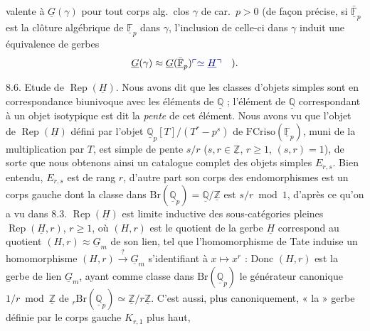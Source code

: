 \documentclass[11pt,a4paper]{article}
\begin{document}
valente à $\underline{G}(\gamma)$ pour tout corps alg.\ clos $\gamma$ de
car.\ $p > 0$ (de façon précise, si $\bar{\underline{\mathbb{F}}}_{p}$ est la
clôture algébrique de $\underline{\mathbb{F}}_{p}$ dans $\gamma$, l'inclusion
de celle-ci dans $\gamma$ induit une équivalence de gerbes
\[
\underline{G}(\gamma) \approx \underline{G}(\bar{\underline{\mathbb{F}}}_{p})
\add{\simeq \underline{H}} \quad ).
\]

8.6. \quad Etude de $\operatorname{Rep}(\underline{H})$. Nous avons dit que
les classes d'objets simples sont en correspondance biunivoque avec les
éléments de $\underline{\mathbb{Q}}$ ; l'élément de $\underline{\mathbb{Q}}$
correspondant à un objet isotypique est dit la \emph{pente} de cet
élément. Nous avons vu que l'objet de $\operatorname{Rep}(\underline{H})$
défini par l'objet $\underline{\mathbb{Q}}_{p}[T]/(T^{r} - p^{s})$ de
$\mathrm{FCriso}(\underline{\mathbb{F}}_{p})$, muni de la multiplication par
$T$, est simple de pente $s/r$ ($s, r \in \underline{\mathbb{Z}}$,
$r \geq 1$, $(s,r) = 1$), de sorte que nous obtenons ainsi un catalogue
complet des objets simples $E_{r,s}$. Bien entendu, $E_{r,s}$ est de rang
$r$, d'autre part son corps des endomorphismes est un corps gauche
 dont la classe dans
$\mathrm{Br}(\underline{\mathbb{Q}}_{p}) = \underline{\mathbb{Q}}/\underline{\mathbb{Z}}$
est $s/r \bmod 1$, d'après ce qu'on a vu dans 8.3.
$\operatorname{Rep}(\underline{H})$ est limite inductive des
sous-catégories pleines $\operatorname{Rep}(\underline{H}, r)$, $r \geq 1$,
où $(H,r)$ est le quotient de la gerbe $\underline{H}$ correspond au quotient
$(H,r) \approx \underline{G}_{m}$ de son lien, tel que l'homomorphisme de
Tate \struck{\ill{}} induise un homomorphisme
$(H,r) \xrightarrow{\ ?\ } \underline{G}_{m}$ s'identifiant à
$x \mapsto x^{r}$ :  Donc $(H,r)$ \struck{\ill{}} est la gerbe de lien
$\underline{G}_{m}$, ayant comme classe dans
$\mathrm{Br}(\underline{\mathbb{Q}}_{p})$ le générateur canonique
$1/r \bmod \underline{\mathbb{Z}}$ de
$_{r}\mathrm{Br}(\underline{\mathbb{Q}}_{p}) \simeq
\underline{\mathbb{Z}}/r\underline{\mathbb{Z}}$. C'est aussi, plus
canoniquement, « la » gerbe définie par le corps gauche $K_{r,1}$ plus haut,

\end{document}
